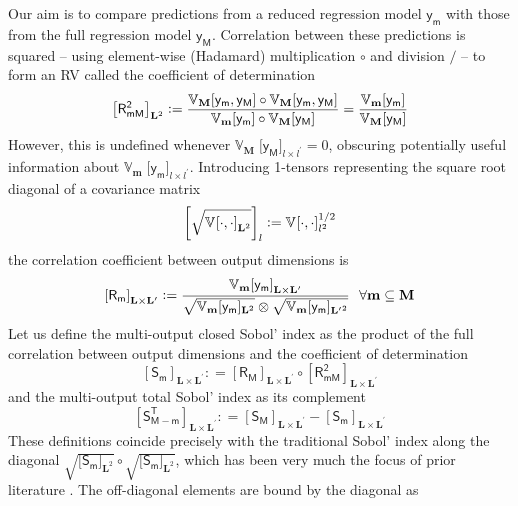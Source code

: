 \documentclass[preprint,12pt]{elsarticle}
\newcommand*{\M}[1]{\ensuremath{#1}\xspace}
\newcommand*{\x}{\times}
\newcommand*{\mi}[1]{\mathbf{#1}}
\newcommand*{\rv}[1]{\mathsf{#1}}
\newcommand*{\te}[2][]{\left\lbrack{#2}\right\rbrack_{#1}}
\newcommand*{\tte}[2][]{\lbrack{#2}\rbrack_{#1}}
\newcommand*{\deq}{\M{\mathrel{\mathop:}=}}
\newcommand*{\cov}[3][]{\ifthenelse{\equal{#1}{}}{\mathbb{V}_{#3}\!\left\lbrack{#2}\right\rbrack}{\mathbb{V}_{#3}\!\left\lbrack{#2,#1}\right\rbrack}}
\newcommand*{\covt}[2]{\mathbb{V}_{#2}\!{#1}}
\begin{document}
    Our aim is to compare predictions from a reduced regression model $\rv{y_m}$ with those from the full regression model $\rv{y_M}$. Correlation between these predictions is squared -- using element-wise (Hadamard) multiplication $\circ$ and division $/$ -- to form an RV called the coefficient of determination
    \begin{equation}
        \te[\mi{L}^2]{\rv{R_{mM}^{2}}} \deq 
        \frac{\cov[\rv{y_M}]{\rv{y_m}}{\mi{M}} \circ \cov[\rv{y_M}]{\rv{y_m}}{\mi{M}}}
        {\cov{\rv{y_m}}{\mi{m}} \circ \cov{\rv{y_M}}{\mi{M}}} =
        \frac{\cov{\rv{y_m}}{\mi{m}}}{\cov{\rv{y_M}}{\mi{M}}}
    \end{equation}
    However, this is undefined whenever $\covt{\;\tte[l\x l^{\prime}]{\rv{y_M}}}{\mi{M}} = 0$, obscuring potentially useful information about $\covt{\;\tte[l\x l^{\prime}]{\rv{y_m}}}{\mi{m}}$. Introducing 1-tensors representing the square root diagonal of a covariance matrix
    \begin{equation}
        \te[l]{\sqrt{\cov[\cdot]{\cdot}{}_{\mi{L}^{2}}}} \deq \cov[\cdot]{\cdot}{}_{l^2}^{1/2}
    \end{equation}
    the correlation coefficient between output dimensions is
    \begin{equation}
        \te[\mi{L\x L^{\prime}}]{\rv{R_{m}}} \deq \frac{\cov{\rv{y_m}}{\mi{m}}_{\mi{L\x L^{\prime}}}} {\sqrt{\covt{\,\tte[\mi{L}^2]{\rv{y_m}}}{\mi{m}}}\otimes\sqrt{\covt{\,\tte[\mi{L^{\prime}}^2]{\rv{y_m}}}{\mi{m}}}}
        \ \ \forall \mi{m}\subseteq \mi{M}
    \end{equation}
    Let us define the multi-output closed Sobol' index as the product of the full correlation between output dimensions and the coefficient of determination
    \begin{equation}
            \te[\mi{L\x L^{\prime}}]{\rv{S_m}} \deq \te[\mi{L\x L^{\prime}}]{\rv{R_{M}}} \circ \te[\mi{L\x L^{\prime}}]{\rv{R_{mM}^{2}}} 
    \end{equation}
    and the multi-output total Sobol' index as its complement
    \begin{equation}
        \te[\mi{L\x L^{\prime}}]{\rv{S^{T}_{M-m}}} \deq \te[\mi{L\x L^{\prime}}]{\rv{S_M}} - \te[\mi{L\x L^{\prime}}]{\rv{S_m}}
    \end{equation}
    These definitions coincide precisely with the traditional Sobol' index along the diagonal $\sqrt{\tte[\mi{L}^{2}]{\rv{S_m}}} \circ \sqrt{\tte[\mi{L}^{2}]{\rv{S_m}}}$, which has been very much the focus of prior literature \cite{Gamboa.etal2013,Xiao2017,GarciaCabrejo2014}. The off-diagonal elements are bound by the diagonal as
\end{document}
